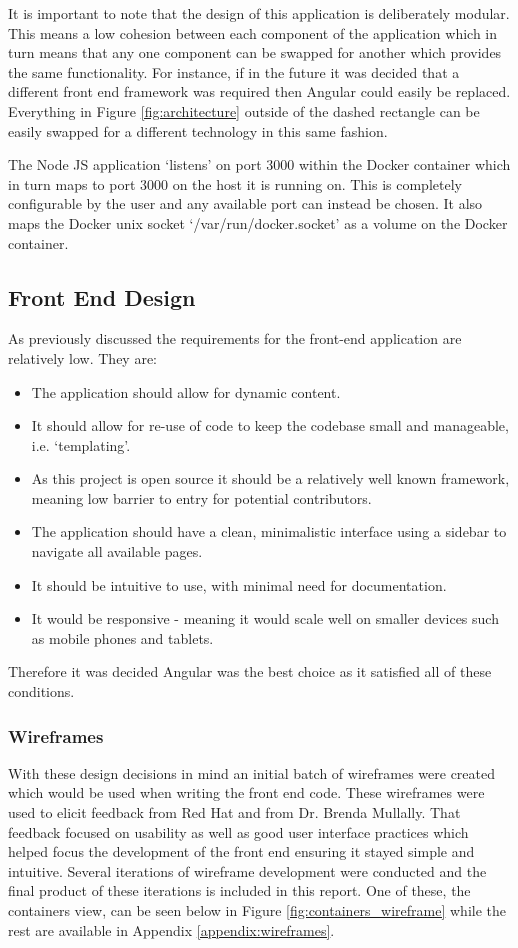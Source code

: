 It is important to note that the design of this application is deliberately modular. This means a low cohesion between each component of the application which in turn means that any one component can be swapped for another which provides the same functionality. For instance, if in the future it was decided that a different front end framework was required then Angular could easily be replaced. Everything in Figure \ref{fig:architecture} outside of the dashed rectangle can be easily swapped for a different technology in this same fashion.

The Node JS application `listens' on port 3000 within the \gls{Docker container} which in turn maps to port 3000 on the host it is running on. This is completely configurable by the user and any available port can instead be chosen. It also maps the Docker unix socket `/var/run/docker.socket' as a volume on the Docker container.  

\subsection{Front End Design}
\label{sub:front-end}
As previously discussed the requirements for the front-end application are relatively low. They are:

\begin{itemize}
	\item The application should allow for dynamic content.
	\item It should allow for re-use of code to keep the codebase small and manageable, i.e. `templating'.
	\item As this project is open source it should be a relatively well known framework, meaning low barrier to entry for potential contributors.
	\item The application should have a clean, minimalistic interface using a sidebar to navigate all available pages. 
	\item It should be intuitive to use, with minimal need for documentation.
	\item It would be responsive - meaning it would scale well on smaller devices such as mobile phones and tablets.
\end{itemize}

Therefore it was decided Angular was the best choice as it satisfied all of these conditions.

\subsubsection{Wireframes}
With these design decisions in mind an initial batch of wireframes were created which would be used when writing the front end code. These wireframes were used to elicit feedback from Red Hat and from Dr. Brenda Mullally. That feedback focused on usability as well as good user interface practices which helped focus the development of the front end ensuring it stayed simple and intuitive. Several iterations of wireframe development were conducted and the final product of these iterations is included in this report. One of these, the containers view, can be seen below in Figure \ref{fig:containers_wireframe} while the rest are available in Appendix \ref{appendix:wireframes}.


